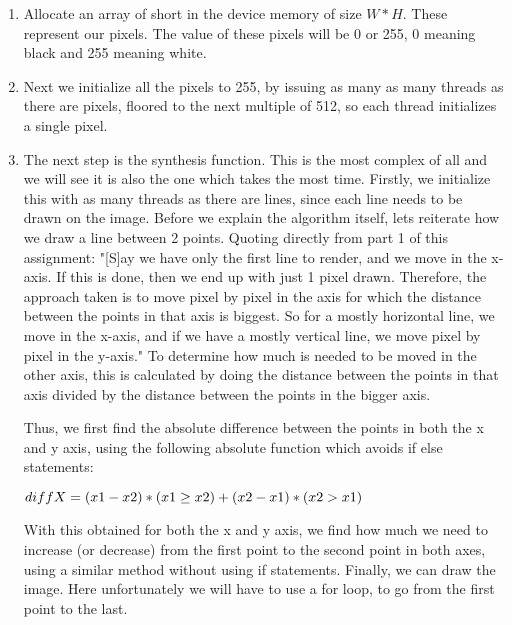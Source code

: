 \begin{enumerate}
	\item Allocate an array of short in the device memory of size $W*H$. These represent our pixels. The value of these pixels will be 0 or 255, 0 meaning black and 255 meaning white.
	
	\item Next we initialize all the pixels to 255, by issuing as many as many threads as there are pixels, floored to the next multiple of 512, so each thread initializes a single pixel.
	
	\item The next step is the synthesis function. This is the most complex of all and we will see it is also the one which takes the most time. Firstly, we initialize this with as many threads as there are lines, since each line needs to be drawn on the image. Before we explain the algorithm itself, lets reiterate how we draw a line between 2 points. Quoting directly from part 1 of this assignment: "[S]ay we have only the first line to render, and we move in the x-axis. If this is done, then we end up with just 1 pixel drawn. Therefore, the approach taken is to move pixel by pixel in the axis for which the distance between the points in that axis is biggest. So for a mostly horizontal line, we move in the x-axis, and if we have a mostly vertical line, we move pixel by pixel in the y-axis." To determine how much is needed to be moved in the other axis, this is calculated by doing the distance between the points in that axis divided by the distance between the points in the bigger axis.
	
	Thus, we first find the absolute difference between the points in both the x and y axis, using the following absolute function which avoids if else statements:
	
	$diffX = (x1-x2)*(x1\ge x2) +\\ (x2-x1)*(x2>x1)$
	
	With this obtained for both the x and y axis, we find how much we need to increase (or decrease) from the first point to the second point in both axes, using a similar method without using if statements. Finally, we can draw the image. Here unfortunately we will have to use a for loop, to go from the first point to the last.
\end{enumerate}